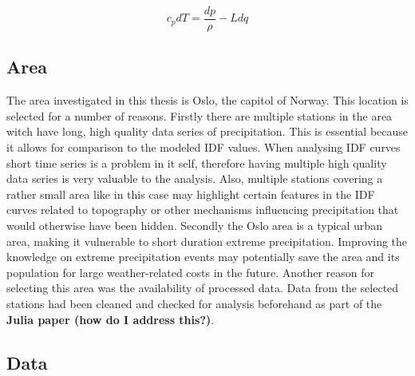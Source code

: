 \begin{equation}
    c_p dT = \frac{dp}{\rho}-L dq
\end{equation}





\subsection{Area}

The area investigated in this thesis is Oslo, the capitol of Norway. This location is selected for a number of reasons. Firstly there are multiple stations in the area witch have long, high quality data series of precipitation. This is essential because it allows for comparison to the modeled IDF values. When analysing IDF curves short time series is a problem in it self, therefore having multiple high quality data series is very valuable to the analysis. Also, multiple stations covering a rather small area like in this case may highlight certain features in the IDF curves related to topography or other mechanisms influencing precipitation that would otherwise have been hidden. Secondly the Oslo area is a typical urban area, making it vulnerable to short duration extreme precipitation. Improving the knowledge on extreme precipitation events may potentially save the area and its population for large weather-related costs in the future. Another reason for selecting this area was the availability of processed data. Data from the selected stations had been cleaned and checked for analysis beforehand as part of the \textbf{Julia paper (how do I address this?)}. 

\subsection{Data}

